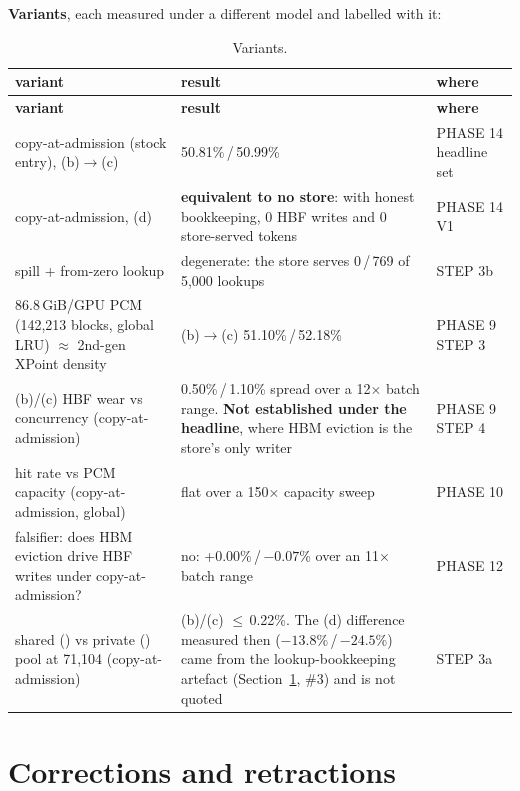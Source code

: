 \documentclass[11pt,a4paper]{article}
\newcommand{\hd}[1]{\textbf{#1}}
\begin{document}
\textbf{Variants}, each measured under a different model and labelled with
it:

\begin{xltabular}{\linewidth}{@{}Y{0.85} Y{1.15} P{24mm}@{}}
\caption{Variants.}\label{tab:variants}\\
\toprule
\hd{variant} & \hd{result} & \hd{where} \\
\midrule
\endfirsthead
\toprule
\hd{variant} & \hd{result} & \hd{where} \\
\midrule
\endhead
\bottomrule
\endlastfoot
copy-at-admission (stock entry), (b)$\to$(c) & 50.81\%\,/\,50.99\% & PHASE 14 headline set \\
copy-at-admission, (d) & \textbf{equivalent to no store}: with honest bookkeeping, 0 HBF writes and 0 store-served tokens & PHASE 14 V1 \\
spill + from-zero lookup & degenerate: the store serves 0\,/\,769 of 5,000 lookups & STEP 3b \\
86.8\,GiB/GPU PCM (142,213 blocks, global LRU) $\approx$ 2nd-gen XPoint density & (b)$\to$(c) 51.10\%\,/\,52.18\% & PHASE 9 STEP 3 \\
(b)/(c) HBF wear vs concurrency (copy-at-admission) & 0.50\%\,/\,1.10\% spread over a 12$\times$ batch range. \textbf{Not established under the headline}, where HBM eviction is the store's only writer & PHASE 9 STEP 4 \\
hit rate vs PCM capacity (copy-at-admission, global) & flat over a 150$\times$ capacity sweep & PHASE 10 \\
falsifier: does HBM eviction drive HBF writes under copy-at-admission? & no: +0.00\%\,/\,$-0.07$\% over an 11$\times$ batch range & PHASE 12 \\
shared () vs private () pool at 71,104 (copy-at-admission) & (b)/(c) $\le$\,0.22\%. The (d) difference measured then ($-13.8$\%\,/\,$-24.5$\%) came from the lookup-bookkeeping artefact (Section~\ref{sec:corrections}, \#3) and is not quoted & STEP 3a \\
\end{xltabular}

\section{Corrections and retractions}\label{sec:corrections}
\end{document}

